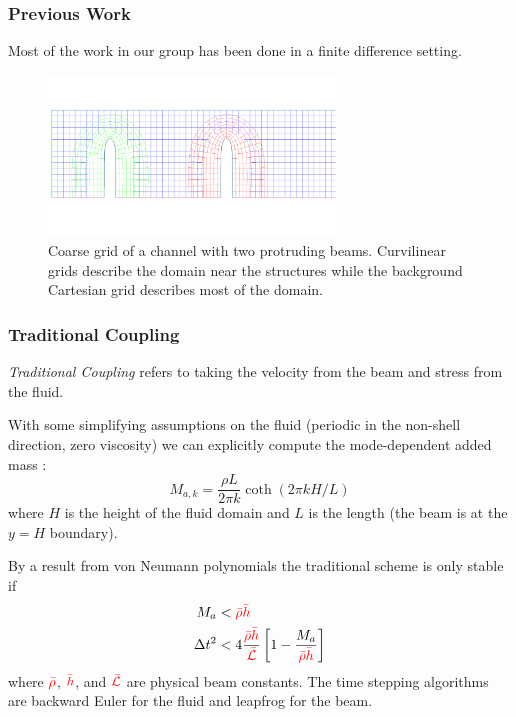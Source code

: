 \documentclass[8pt]{beamer}
\newcommand{\leftd}[1]{{\color{red} \bar{#1}}}
\begin{document}
\begin{frame}
    \frametitle{Previous Work}
    Most of the work in our group has been done in a finite difference setting.
    \begin{figure}
        \centering

        \includegraphics[width=3in]{longfei.png}

        \caption{Coarse grid of a channel with two protruding beams. Curvilinear
        grids describe the domain near the structures while the background
        Cartesian grid describes most of the domain.}
    \end{figure}
\end{frame}

\begin{frame}
    \frametitle{Traditional Coupling}
    \emph{Traditional Coupling} refers to taking the velocity from the beam and
    stress from the fluid.

    With some simplifying assumptions on the fluid (periodic in the non-shell
    direction, zero viscosity) we can explicitly compute the mode-dependent
    added mass \cite{amp-incompressible, causin-gerbeau-nobile-2010}:
    \begin{equation}
        M_{a,k} = \dfrac{\rho L}{2 \pi k} \coth(2 \pi k H / L)
    \end{equation}
    where \(H\) is the height of the fluid domain and \(L\) is the length (the
    beam is at the \(y = H\) boundary).

    \pause
    By a result from von Neumann polynomials the traditional scheme is only
    stable if
    \begin{align}
        M_a &< \leftd{\rho} \leftd{h}                                         \\
        \Delta t^2 &< 4 \dfrac{\leftd{\rho} \leftd{h}}{\leftd{\mathcal{L}}}
        \left[1 - \dfrac{M_a}{\leftd{\rho} \leftd{h}}\right]
    \end{align}
    where \(\leftd{\rho}\), \(\leftd{h}\), and \(\leftd{\mathcal{L}}\) are
    physical beam constants. The time stepping algorithms are backward Euler for
    the fluid and leapfrog for the beam.
\end{frame}
\end{document}
